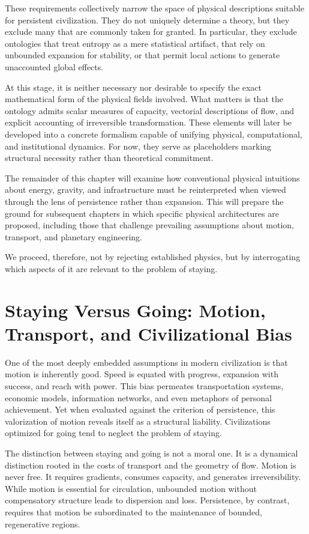 \documentclass[12pt,oneside]{book}
\begin{document}
These requirements collectively narrow the space of physical descriptions suitable for persistent civilization. They do not uniquely determine a theory, but they exclude many that are commonly taken for granted. In particular, they exclude ontologies that treat entropy as a mere statistical artifact, that rely on unbounded expansion for stability, or that permit local actions to generate unaccounted global effects.

At this stage, it is neither necessary nor desirable to specify the exact mathematical form of the physical fields involved. What matters is that the ontology admits scalar measures of capacity, vectorial descriptions of flow, and explicit accounting of irreversible transformation. These elements will later be developed into a concrete formalism capable of unifying physical, computational, and institutional dynamics. For now, they serve as placeholders marking structural necessity rather than theoretical commitment.

The remainder of this chapter will examine how conventional physical intuitions about energy, gravity, and infrastructure must be reinterpreted when viewed through the lens of persistence rather than expansion. This will prepare the ground for subsequent chapters in which specific physical architectures are proposed, including those that challenge prevailing assumptions about motion, transport, and planetary engineering.

We proceed, therefore, not by rejecting established physics, but by interrogating which aspects of it are relevant to the problem of staying.

\chapter{Staying Versus Going: Motion, Transport, and Civilizational Bias}

One of the most deeply embedded assumptions in modern civilization is that motion is inherently good. Speed is equated with progress, expansion with success, and reach with power. This bias permeates transportation systems, economic models, information networks, and even metaphors of personal achievement. Yet when evaluated against the criterion of persistence, this valorization of motion reveals itself as a structural liability. Civilizations optimized for going tend to neglect the problem of staying.

The distinction between staying and going is not a moral one. It is a dynamical distinction rooted in the costs of transport and the geometry of flow. Motion is never free. It requires gradients, consumes capacity, and generates irreversibility. While motion is essential for circulation, unbounded motion without compensatory structure leads to dispersion and loss. Persistence, by contrast, requires that motion be subordinated to the maintenance of bounded, regenerative regions.
\end{document}
